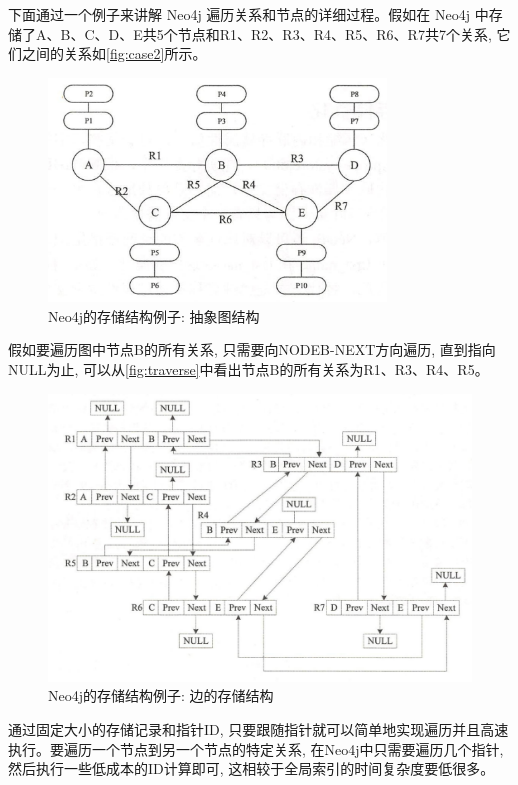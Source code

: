下面通过一个例子来讲解 Neo4j 遍历关系和节点的详细过程。假如在 Neo4j 中存储了A、B、C、D、E共5个节点和R1、R2、R3、R4、R5、R6、R7共7个关系, 它们之间的关系如\cref{fig:case2}所示。
\begin{figure}[!t]
	\centering
	\includegraphics[width=0.8\textwidth]{images/19.png}
	\caption{Neo4j的存储结构例子: 抽象图结构}
	\label{fig:neo4j-case2}
\end{figure}
假如要遍历图中节点B的所有关系, 只需要向NODEB-NEXT方向遍历, 直到指向NULL为止, 可以从\cref{fig:traverse}中看出节点B的所有关系为R1、R3、R4、R5。
\begin{figure}[H]
	\centering
	\includegraphics[width=1\textwidth]{images/20.png}
	\caption{Neo4j的存储结构例子: 边的存储结构}
	\label{fig:neo4j-traverse }
\end{figure}
通过固定大小的存储记录和指针ID, 只要跟随指针就可以简单地实现遍历并且高速执行。要遍历一个节点到另一个节点的特定关系, 在Neo4j中只需要遍历几个指针, 然后执行一些低成本的ID计算即可, 这相较于全局索引的时间复杂度要低很多。




